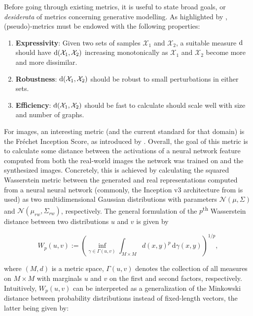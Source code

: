 Before going through existing metrics, it is useful to state broad goals, or
\emph{desiderata} of metrics concerning generative modelling. As highlighted by
\cite{o2021evaluation}, (pseudo)-metrics must be endowed with the following
properties:

\begin{enumerate}
\item \textbf{Expressivity}: Given two sets of samples $\mathcal{X}_1$ and
$\mathcal{X}_2$, a suitable measure $\text{d}$ should have
$\text{d}(\mathcal{X}_1,\mathcal{X}_2)$ increasing monotonically as
$\mathcal{X}_1$ and $\mathcal{X}_2$ become more and more dissimilar.
\item \textbf{Robustness}: $\text{d}(\mathcal{X}_1,\mathcal{X}_2)$ should be
robust to small perturbations in either sets.
\item \textbf{Efficiency}: $\text{d}(\mathcal{X}_1,\mathcal{X}_2)$ should be
fast to calculate should scale well with size and number of graphs.
\end{enumerate}


For images, an interesting metric (and the current standard for that domain) is
the Fr\'echet Inception Score, as introduced by \citet{heusel2017gans}. Overall,
the goal of this metric is to calculate some distance between the activations of
a neural network feature computed from both the real-world images the network
was trained on and the synthesized images. Concretely, this is achieved by
calculating the squared Wasserstein metric between the generated and real
representations computed from a neural neural network (commonly, the Inception
v3 architecture from \citet{szegedy2015rethinking} is used) as two
multidimensional Gaussian distributions with parameters $\mathcal{N}(\mu,
\Sigma)$ and $\mathcal{N}(\mu_{rw}, \Sigma_{rw})$, respectively. The general
formulation of the $p$\textsuperscript{th} Wasserstein distance between two
distributions $u$ and $v$ is given by

\begin{equation}
  \label{eq:wasserstein_distance} W_p(u,v) := \left(\inf _{\gamma \in \Gamma
(u,v)}\int _{M\times M}d(x,y)^{p}\,\mathrm {d} \gamma (x,y)\right)^{1/p},
\end{equation}

where $(M, d)$ is a metric space, $\Gamma (u,v)$ denotes the collection of all
measures on $M\times M$ with marginals $u$ and $v$ on the first and second
factors, respectively. Intuitively, $W_p(u,v)$ can be interpreted as a
generalization of the Minkowski distance between probability distributions
instead of fixed-length vectors, the latter being given by:

